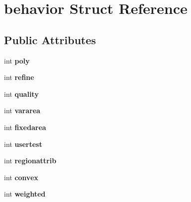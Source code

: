\hypertarget{structbehavior}{\section{behavior Struct Reference}
\label{structbehavior}
}
\subsection*{Public Attributes}
\begin{DoxyCompactItemize}
\item 
\hypertarget{structbehavior_a34495ca52e6406ead41e4d37758b03e4}{int {\bfseries poly}}\label{structbehavior_a34495ca52e6406ead41e4d37758b03e4}

\item 
\hypertarget{structbehavior_a782cbc85135e774ebaea351cab41ed2f}{int {\bfseries refine}}\label{structbehavior_a782cbc85135e774ebaea351cab41ed2f}

\item 
\hypertarget{structbehavior_aff272ed01675024380027f9e972d45ce}{int {\bfseries quality}}\label{structbehavior_aff272ed01675024380027f9e972d45ce}

\item 
\hypertarget{structbehavior_ac52f72b313e292dce59dd7554c040935}{int {\bfseries vararea}}\label{structbehavior_ac52f72b313e292dce59dd7554c040935}

\item 
\hypertarget{structbehavior_a3517c8cc065b15326ac2784bce0fecf7}{int {\bfseries fixedarea}}\label{structbehavior_a3517c8cc065b15326ac2784bce0fecf7}

\item 
\hypertarget{structbehavior_afac6b65f184f98f84724b94e06b49af3}{int {\bfseries usertest}}\label{structbehavior_afac6b65f184f98f84724b94e06b49af3}

\item 
\hypertarget{structbehavior_a9fc10997a6c91aaa9894d81432d9f4dc}{int {\bfseries regionattrib}}\label{structbehavior_a9fc10997a6c91aaa9894d81432d9f4dc}

\item 
\hypertarget{structbehavior_a136866fb4c5c376089eec0a5e305e237}{int {\bfseries convex}}\label{structbehavior_a136866fb4c5c376089eec0a5e305e237}

\item 
\hypertarget{structbehavior_a1dc051c2e5ab8cfd9031609da2cb22bf}{int {\bfseries weighted}}\label{structbehavior_a1dc051c2e5ab8cfd9031609da2cb22bf}


\end{DoxyCompactItemize}
